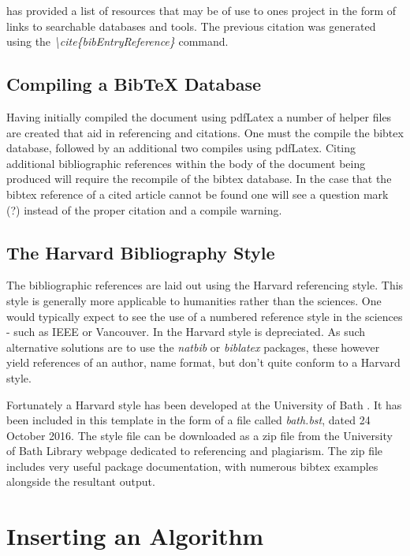 \cite{online:Doolan:2016:AcademicResources} has provided a list of resources that may be of use to ones project in the form of links to searchable databases and \latex tools. The previous citation was generated using the \emph{\textbackslash cite\{bibEntryReference\}} command. 

\subsection{Compiling a BibTeX Database}

Having initially compiled the document using pdfLatex a number of helper files are created that aid in referencing and citations. One must the compile the bibtex database, followed by an additional two compiles using pdfLatex. Citing additional bibliographic references within the body of the document being produced will require the recompile of the bibtex database. In the case that the bibtex reference of a cited article cannot be found one will see a question mark (?) instead of the proper citation and a compile warning.

\subsection{The Harvard Bibliography Style}

The bibliographic references are laid out using the Harvard referencing style. This style is generally more applicable to humanities rather than the sciences. One would typically expect to see the use of a numbered reference style in the sciences - such as IEEE or Vancouver. In \latex the Harvard style is depreciated. As such alternative solutions are to use the \emph{natbib} or \emph{biblatex} packages, these however yield references of an author, name format, but don't quite conform to a Harvard style. 

Fortunately a Harvard style has been developed at the University of Bath \citep{online:Bath:2016:HarvardBathStyle}. It has been included in this template in the form of a file called \emph{bath.bst}, dated 24 October 2016. The style file can be downloaded as a zip file from the University of Bath Library webpage dedicated to referencing and plagiarism. The zip file includes very useful package documentation, with numerous bibtex examples alongside the resultant output.  

\section{Inserting an Algorithm}

